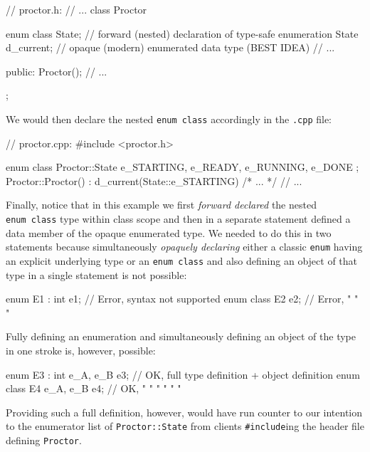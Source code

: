 \begin{emcppslisting}[emcppsbatch=e5]
// proctor.h:
// ...
class Proctor
{
    enum class State;  // forward (nested) declaration of type-safe enumeration
    State d_current;   // opaque (modern) enumerated data type (BEST IDEA)
    // ...

public:
    Proctor();
    // ...
};
\end{emcppslisting}

\noindent We would then declare the nested
\lstinline!enum!~\lstinline!class! %
accordingly in the
\lstinline!.cpp! file:

\begin{emcppslisting}[emcppsbatch=e5]
// proctor.cpp:
#include <proctor.h>

enum class Proctor::State { e_STARTING, e_READY, e_RUNNING, e_DONE };
Proctor::Proctor() : d_current(State::e_STARTING) { /* ... */ }
// ...
\end{emcppslisting}

\noindent Finally, notice that in this example we first \emph{forward declared}
the nested \lstinline!enum!~\lstinline!class! type within class scope and
then in a separate statement defined a data member of the opaque
enumerated type. We needed to do this in two statements because
simultaneously \emph{opaquely declaring} either a classic \lstinline!enum!
having an explicit underlying type %
or an
\lstinline!enum!~\lstinline!class! %
and also defining an object
of that type in a single statement is not possible:

\begin{emcppslisting}
enum E1 : int e1;  // Error, syntax not supported
enum class E2 e2;  // Error,    "    "     "
\end{emcppslisting}

\noindent Fully defining an enumeration and simultaneously defining an object of
the type in one stroke is, however, possible:

\begin{emcppslisting}
enum E3 : int { e_A, e_B } e3;  // OK, full type definition + object definition
enum class E4 { e_A, e_B } e4;  // OK,  "    "       "      "   "        "
\end{emcppslisting}

\noindent Providing such a full definition, however, would have run counter to our
intention to  the enumerator list of
\lstinline!Proctor::State! from clients \lstinline!#include!ing the header
file defining \lstinline!Proctor!.

